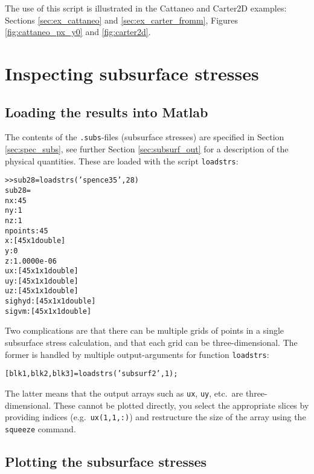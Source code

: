 \documentclass[12pt]{report}
\begin{document}
The use of this script is illustrated in the Cattaneo and Carter2D
examples: Sections \ref{sec:ex_cattaneo} and \ref{sec:ex_carter_fromm},
Figures \ref{fig:cattaneo_px_y0} and \ref{fig:carter2d}.

\section{Inspecting subsurface stresses}
\label{sec:plot_subs}

\subsection{Loading the results into Matlab}

The contents of the {\tt .subs}-files (subsurface stresses) are specified in
Section \ref{sec:spec_subs}, see further Section \ref{sec:subsurf_out} for a
description of the physical quantities. These are loaded with the script
{\tt loadstrs}:
\begin{alltt}\small
>> sub28 = loadstrs('spence35', 28)
sub28 =
         nx: 45
         ny: 1
         nz: 1
    npoints: 45
          x: [45x1 double]
          y: 0
          z: 1.0000e-06
         ux: [45x1x1 double]
         uy: [45x1x1 double]
         uz: [45x1x1 double]
     sighyd: [45x1x1 double]
      sigvm: [45x1x1 double]
\end{alltt}
Two complications are that there can be multiple grids of points in a single
subsurface stress calculation, and that each grid can be three-dimensional.
The former is handled by multiple output-arguments for function {\tt loadstrs}:
\begin{alltt}\small
  [blk1, blk2, blk3] = loadstrs('subsurf2', 1);
\end{alltt}
The latter means that the output arrays such as {\tt ux}, {\tt uy}, etc.\
are three-dimensional. These cannot be plotted directly, you select the
appropriate slices by providing indices (e.g.\ {\tt ux(1,1,:)}) and
restructure the size of the array using the {\tt squeeze} command.

\subsection{Plotting the subsurface stresses}
\end{document}
